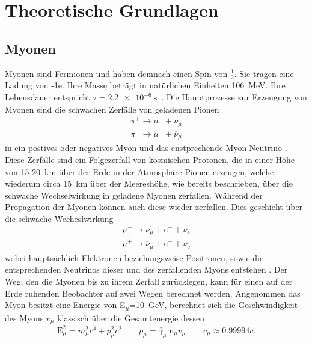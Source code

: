 \section{Theoretische Grundlagen}
    \subsection{Myonen}
        Myonen sind Fermionen und haben demnach einen Spin von $\frac{1}{2}$. Sie tragen eine Ladung von -1e. Ihre Masse beträgt in natürlichen Einheiten \SI{106}{\mega\electronvolt}. Ihre Lebensdauer 
        entspricht $\tau = \SI{2.2e-6}{\second}$~\cite{zyla_review_2020}. Die Hauptprozesse zur Erzeugung von Myonen sind die schwachen Zerfälle von geladenen Pionen
        \begin{align*}
            \pi^+ \longrightarrow \mu^+ + \nu_{\mu} \\
            \pi^- \longrightarrow \mu^- + \overline{\nu}_{\mu}
        \end{align*}
        in ein postives oder negatives Myon und das enstprechende Myon-Neutrino \cite{grupen_einstieg_2018}. Diese Zerfälle sind ein Folgezerfall von kosmischen Protonen, die in einer Höhe von 
        15-\SI{20}{\kilo\metre} über der Erde in der Atmosphäre Pionen erzeugen, welche wiederum circa \SI{15}{\kilo\metre} über der Meereshöhe, wie bereits beschrieben, über die schwache Wechselwirkung in 
        geladene Myonen zerfallen. Während der Propagation der Myonen können auch diese wieder zerfallen. Dies geschieht über die schwache Wecheslwirkung 
        \begin{align*}
            \mu^- \longrightarrow \nu_{\mu} + \text{e}^- + \overline{\nu}_{\text{e}} \\
            \mu^+ \longrightarrow \overline{\nu}_{\mu} + \text{e}^+ + \nu_{\text{e}} 
        \end{align*}
        wobei hauptsächlich Elektronen beziehungsweise Positronen, sowie die entsprechenden Neutrinos dieser und des zerfallenden Myons entstehen \cite{grupen_einstieg_2018}. Der Weg, den die Myonen bis zu 
        ihrem Zerfall zurücklegen, kann für einen auf der Erde ruhenden Beobachter auf zwei Wegen berechnet werden. Angenommen das Myon besitzt eine Energie von E$_{\mu}$=\SI{10}{\giga\electronvolt}, berechnet 
        sich die Geschwindigkeit des Myons $v_{\mu}$ klassisch über die Gesamtenergie dessen 
        \begin{equation*}
            \text{E}_{\mu}^2 = m_{\mu}^2c^4 + p_{\mu}^2c^2 \qquad \underrightarrow{p_{\mu}=\gamma_{\mu} \text{m}_{\mu}v_{\mu}} \qquad v_{\mu} \approx \num{0.99994}c .
        \end{equation*}
